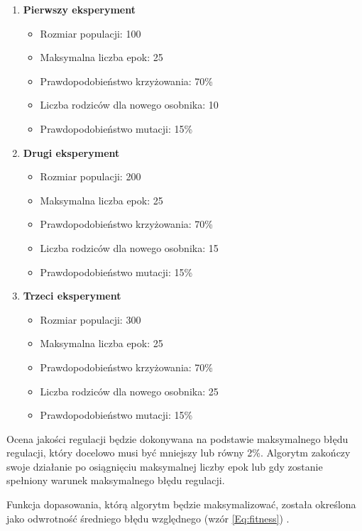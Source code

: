 \documentclass[12pt,twoside]{article}
\begin{document}
\begin{enumerate}[label=\alph*), leftmargin=1.25cm]
    \item \textbf{Pierwszy eksperyment}
    \begin{itemize}
        \item Rozmiar populacji: 100
        \item Maksymalna liczba epok: 25
        \item Prawdopodobieństwo krzyżowania: 70\%
        \item Liczba rodziców dla nowego osobnika: 10
        \item Prawdopodobieństwo mutacji: 15\%
    \end{itemize}
    
    \item \textbf{Drugi eksperyment}
    \begin{itemize}
        \item Rozmiar populacji: 200
        \item Maksymalna liczba epok: 25
        \item Prawdopodobieństwo krzyżowania: 70\%
        \item Liczba rodziców dla nowego osobnika: 15
        \item Prawdopodobieństwo mutacji: 15\%
    \end{itemize}
    
    \item \textbf{Trzeci eksperyment}
    \begin{itemize}
        \item Rozmiar populacji: 300
        \item Maksymalna liczba epok: 25
        \item Prawdopodobieństwo krzyżowania: 70\%
        \item Liczba rodziców dla nowego osobnika: 25
        \item Prawdopodobieństwo mutacji: 15\%
    \end{itemize}
\end{enumerate}


Ocena jakości regulacji będzie dokonywana na podstawie maksymalnego błędu regulacji, który docelowo musi być mniejszy lub równy 2\%. Algorytm zakończy swoje działanie po osiągnięciu maksymalnej liczby epok lub gdy zostanie spełniony warunek maksymalnego błędu regulacji.

Funkcja dopasowania, którą algorytm będzie maksymalizować, została określona jako odwrotność średniego błędu względnego (wzór \ref{Eq:fitness}) .
\end{document}
